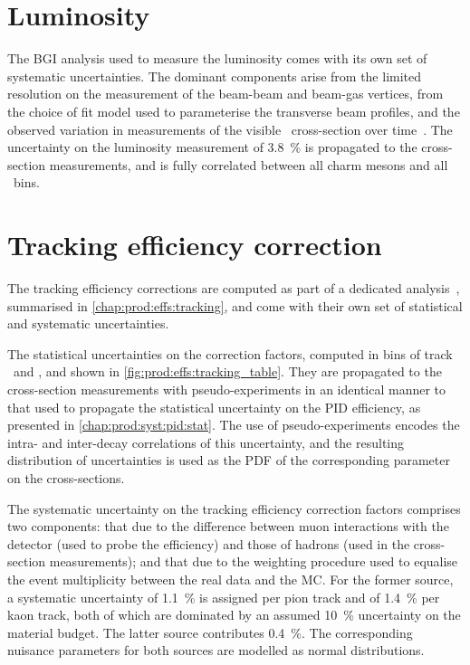 \section{Luminosity}
\label{chap:prod:syst:lumi}

The \acl{BGI} analysis used to measure the luminosity comes with its own set of 
systematic uncertainties.
The dominant components arise from the limited resolution on the measurement of 
the beam-beam and beam-gas vertices, from the choice of fit model used to 
parameterise the transverse beam profiles, and the observed variation in 
measurements of the visible \pp\ cross-section over 
time~\cite{LHCb-PAPER-2014-047}.
The uncertainty on the luminosity measurement of \SI{3.8}{\%} is propagated to 
the cross-section measurements, and is fully correlated between all charm 
mesons and all \pTy\ bins.

\section{Tracking efficiency correction}
\label{chap:prod:syst:tracking}

The tracking efficiency corrections are computed as part of a dedicated 
analysis~\cite{Aaij:2014pwa}, summarised in \cref{chap:prod:effs:tracking}, and 
come with their own set of statistical and systematic uncertainties.

The statistical uncertainties on the correction factors, computed in bins of 
track \ptot\ and \Eta, and shown in \cref{fig:prod:effs:tracking_table}.
They are propagated to the cross-section measurements with pseudo-experiments 
in an identical manner to that used to propagate the statistical uncertainty on 
the \ac{PID} efficiency, as presented in \cref{chap:prod:syst:pid:stat}.
The use of pseudo-experiments encodes the intra- and inter-decay correlations 
of this uncertainty, and the resulting distribution of uncertainties is used as 
the \ac{PDF} of the corresponding parameter on the cross-sections.

The systematic uncertainty on the tracking efficiency correction factors 
comprises two components: that due to the difference between muon interactions 
with the detector (used to probe the efficiency) and those of hadrons (used in 
the cross-section measurements); and that due to the weighting procedure used 
to equalise the event multiplicity between the real data and the \ac{MC}.
For the former source, a systematic uncertainty of \SI{1.1}{\percent} is 
assigned per pion track and of \SI{1.4}{\percent} per kaon track, both of which 
are dominated by an assumed \SI{10}{\percent} uncertainty on the material 
budget.
The latter source contributes \SI{0.4}{\percent}.
The corresponding nuisance parameters for both sources are modelled as normal 
distributions.

